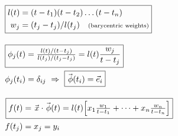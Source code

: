 \documentclass[12pt]{article}
\newcommand{\hs}{\hspace{1pt}}
\newcommand{\hsvec}[1]{\vec{\hs #1}}
\begin{document}
\vspace{5pt}
\(
    \begin{aligned}
        &\boxed{ 
            \begin{aligned}
                l(t) &= (t-t_1)(t-t_2)\dots(t-t_n)\\
                w_j &= (t_j - t_j) / l(t_j) \hspace{10pt} \text{\scriptsize(barycentric weights)}
            \end{aligned} 
        }
            \\[10pt]
        &\begin{aligned}
            \Aboxed{ \phi_j(t) &= \tfrac{ l(t) / (t-t_j) }{ l(t_j) / (t_j-t_j) } 
                = l(t) \frac{w_j}{t-t_j} }
                \\
            \phi_j(t_i) &= \delta_{ij} \ \Rightarrow \ \boxed{ \hsvec{\phi}(t_i) = \vec{e}_i }
        \end{aligned}
            \\[10pt]
        &\begin{aligned}
            \Aboxed{ f(t) &= \hsvec{x} \cdot \hsvec{\phi}(t)
                = l(t) \Big[ x_1 \tfrac{w_1}{t-t_1} + \dots + x_n \tfrac{w_n}{t-t_n} \Big] }
                \\
            f(t_j) &= x_j = y_i
        \end{aligned}
    \end{aligned}
\)
\hspace{5pt}
\vline
\hspace{5pt}
\end{document}
